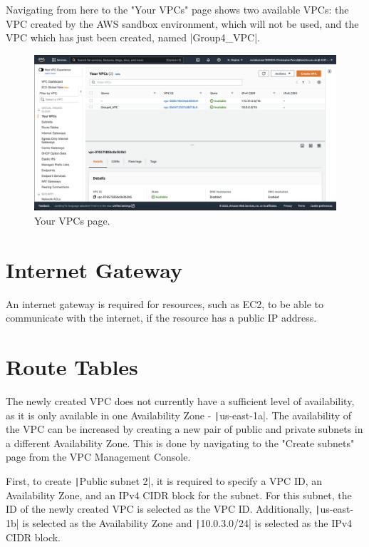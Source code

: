 Navigating from here to the "Your VPCs" page shows two available VPCs: the VPC created by the AWS sandbox
environment, which will not be used, and the VPC which has just been created, named |Group4_VPC|.

\begin{figure}[!htbp]
    \centering
    \includegraphics[width=\textwidth]{resources/vpc/your_vpcs}
    \caption{Your VPCs page.}
    \label{fig:vpc-step-5}
\end{figure}

\section{Internet Gateway}\label{sec:internet-gateway}

An internet gateway is required for resources, such as EC2, to be able to communicate with the internet, if the resource
has a public IP address.


\section{Route Tables}\label{sec:route-tables}

The newly created VPC does not currently have a sufficient level of availability, as it is only available in one
Availability Zone - \texttt|us-east-1a|.
The availability of the VPC can be increased by creating a new pair of public and private subnets in a different
Availability Zone.
This is done by navigating to the "Create subnets" page from the VPC Management Console.

First, to create \texttt|Public subnet 2|, it is required to specify a VPC ID, an Availability Zone, and an
IPv4 CIDR block for the subnet.
For this subnet, the ID of the newly created VPC is selected as the VPC ID\@.
Additionally, \texttt|us-east-1b| is selected as the Availability Zone and
\texttt|10.0.3.0/24| is selected as the IPv4 CIDR block.

